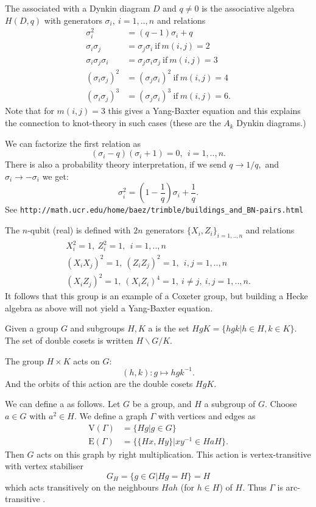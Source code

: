 \documentclass[12pt]{article}
\begin{document}
The  associated with a Dynkin diagram $D$
and $q\ne 0$ 
is the associative algebra $H(D,q)$ with
generators $\sigma_i,\ i=1,..,n$ and relations
\begin{align*}
\sigma_i^2 &= (q-1)\sigma_i + q \\
\sigma_i \sigma_j &= \sigma_j \sigma_i \ \mbox{if}\ m(i,j)=2 \\
\sigma_i \sigma_j \sigma_i &= \sigma_j \sigma_i \sigma_j \ \mbox{if}\ m(i,j)=3 \\
(\sigma_i \sigma_j)^2 &= (\sigma_j \sigma_i)^2 \ \mbox{if}\ m(i,j)=4 \\
(\sigma_i \sigma_j)^3 &= (\sigma_j \sigma_i)^3 \ \mbox{if}\ m(i,j)=6.
\end{align*}
Note that for $m(i,j)=3$ this gives a Yang-Baxter equation and this
explains the connection to knot-theory in such cases (these are the $A_k$ Dynkin diagrams.)

We can factorize the first relation as
$$
    (\sigma_i - q)(\sigma_i + 1) = 0, \ \ i=1,..,n.
$$
There is also a probability theory interpretation,
if we send $q\to 1/q,$ and $\sigma_i\to -\sigma_i$ we get:
$$
    \sigma_i^2 = (1-\frac{1}{q})\sigma_i + \frac{1}{q}.
$$
See {\tt http://math.ucr.edu/home/baez/trimble/buildings\_and\_BN-pairs.html}


The $n$-qubit (real)  is defined with
$2n$ generators $\{X_i, Z_i\}_{i=1,..,n}$
and relations
\begin{align*}
    X_i^2 = 1,       \ Z_i^2 = 1,\ \ i=1,..,n\\
    (X_i X_j)^2 = 1, \ (Z_i Z_j)^2 = 1,\ \ i,j=1,..,n\\
    (X_i Z_j)^2 = 1, \ (X_i Z_i)^4 = 1, \ i\ne j,\ i,j=1,..,n.
\end{align*}
It follows that this group is an example of a Coxeter group,
but building a Hecke algebra as above will not yield a 
Yang-Baxter equation.


Given a group $G$ and subgroups $H, K$ a
is the set $HgK=\{hgk | h\in H, k\in K\}.$
The set of double cosets is written $H\backslash G/K.$

%

The group $H\times K$ acts on $G:$ 
$$
    (h, k) : g \mapsto hgk^{-1}.
$$
And the orbits of this action are the double cosets $HgK.$

We can define a  as follows.
Let $G$ be a group, and $H$ a subgroup of $G.$
Choose $a\in G$ with $a^2\in H.$
We define a graph $\Gamma$
with vertices and edges as
\begin{align*}
    \mbox{V}(\Gamma) &= \{ Hg | g\in G\} \\
    \mbox{E}(\Gamma) &= \{ \{Hx, Hy\} | xy^{-1}\in HaH\}.
\end{align*}
Then $G$ acts on this graph by right multiplication.
This action is vertex-transitive with vertex stabiliser
$$
G_H = \{g \in G | Hg = H\} = H
$$
which acts
transitively on the neighbours $Hah$ (for $h \in H$) of $H$.
Thus $\Gamma$ is arc-transitive \cite{Sabidussi1964}.
\end{document}
